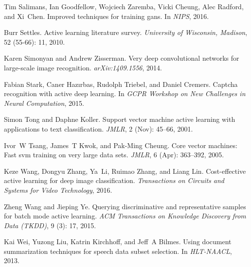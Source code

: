 \documentclass{article} %
\begin{document}
\begin{thebibliography}{51}
Tim Salimans, Ian Goodfellow, Wojciech Zaremba, Vicki Cheung, Alec Radford, and
  Xi~Chen.
\newblock Improved techniques for training gans.
\newblock In \emph{NIPS}, 2016.

Burr Settles.
\newblock Active learning literature survey.
\newblock \emph{University of Wisconsin, Madison}, 52
  (55-66): 11, 2010.

Karen Simonyan and Andrew Zisserman.
\newblock Very deep convolutional networks for large-scale image recognition.
\newblock \emph{arXiv:1409.1556}, 2014.

Fabian Stark, Caner Haz{\i}rbas, Rudolph Triebel, and Daniel Cremers.
\newblock Captcha recognition with active deep learning.
\newblock In \emph{GCPR Workshop on New Challenges in Neural Computation},
  2015.

Simon Tong and Daphne Koller.
\newblock Support vector machine active learning with applications to text
  classification.
\newblock \emph{JMLR}, 2 (Nov): 45--66, 2001.

Ivor~W Tsang, James~T Kwok, and Pak-Ming Cheung.
\newblock Core vector machines: Fast svm training on very large data sets.
\newblock \emph{JMLR}, 6 (Apr): 363--392, 2005.

Keze Wang, Dongyu Zhang, Ya~Li, Ruimao Zhang, and Liang Lin.
\newblock Cost-effective active learning for deep image classification.
\newblock \emph{Transactions on Circuits and Systems for Video Technology},
  2016.

Zheng Wang and Jieping Ye.
\newblock Querying discriminative and representative samples for batch mode
  active learning.
\newblock \emph{ACM Transactions on Knowledge Discovery from Data (TKDD)},
  9 (3): 17, 2015.

Kai Wei, Yuzong Liu, Katrin Kirchhoff, and Jeff~A Bilmes.
\newblock Using document summarization techniques for speech data subset
  selection.
\newblock In \emph{HLT-NAACL}, 2013.


\end{thebibliography}
\end{document}

